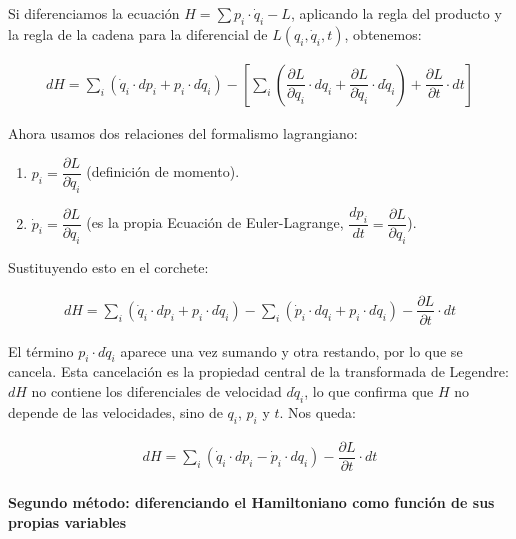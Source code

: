 \documentclass[
  spanish,
]{article}
\providecommand{\tightlist}{%
  \setlength{\itemsep}{0pt}\setlength{\parskip}{0pt}}
\begin{document}
Si diferenciamos la ecuación \(H = \sum p_i \cdot \dot{q}_i - L\),
aplicando la regla del producto y la regla de la cadena para la
diferencial de \(L(q_i, \dot{q}_i, t)\), obtenemos:

\[
\begin{aligned}
dH = \sum_{i} (\dot{q}_i \cdot dp_i + p_i \cdot d\dot{q}_i) - \left[ \sum_{i} \left( \dfrac{\partial L}{\partial q_i} \cdot dq_i + \dfrac{\partial L}{\partial \dot{q}_i} \cdot d\dot{q}_i \right) + \dfrac{\partial L}{\partial t} \cdot dt \right]
\end{aligned}
\]

Ahora usamos dos relaciones del formalismo lagrangiano:

\begin{enumerate}
\def\labelenumi{\arabic{enumi}.}
\tightlist
\item
  \(p_i = \dfrac{\partial L}{\partial \dot{q}_i}\) (definición de
  momento).
\item
  \(\dot{p}_i = \dfrac{\partial L}{\partial q_i}\) (es la propia
  Ecuación de Euler-Lagrange,
  \(\dfrac{d p_i}{dt} = \dfrac{\partial L}{\partial q_i}\)).
\end{enumerate}

Sustituyendo esto en el corchete:

\[
\begin{aligned}
dH = \sum_{i} (\dot{q}_i \cdot dp_i + p_i \cdot d\dot{q}_i) - \sum_{i} (\dot{p}_i \cdot dq_i + p_i \cdot d\dot{q}_i) - \dfrac{\partial L}{\partial t} \cdot dt
\end{aligned}
\]

El término \(p_i \cdot d\dot{q}_i\) aparece una vez sumando y otra
restando, por lo que se cancela. Esta cancelación es la propiedad
central de la transformada de Legendre: \(dH\) no contiene los
diferenciales de velocidad \(d\dot{q}_i\), lo que confirma que \(H\) no
depende de las velocidades, sino de \(q_i\), \(p_i\) y \(t\). Nos queda:

\[
\begin{aligned}
dH = \sum_{i} (\dot{q}_i \cdot dp_i - \dot{p}_i \cdot dq_i) - \dfrac{\partial L}{\partial t} \cdot dt
\end{aligned}
\]

\paragraph{Segundo método: diferenciando el Hamiltoniano como función de
sus propias
variables}\label{segundo-muxe9todo-diferenciando-el-hamiltoniano-como-funciuxf3n-de-sus-propias-variables}
\end{document}
